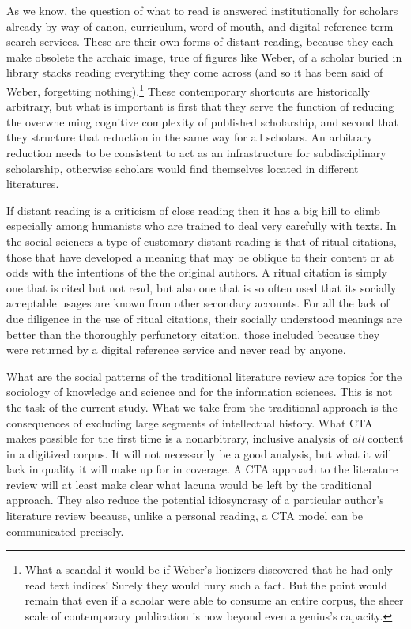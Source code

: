 \documentclass[]{book}
\let\rmarkdownfootnote\footnote%
\def\footnote{\protect\rmarkdownfootnote}
\theoremstyle{definition}
\theoremstyle{definition}
\theoremstyle{definition}
\theoremstyle{remark}
\begin{document}
As we know, the question of what to read is answered institutionally for
scholars already by way of canon, curriculum, word of mouth, and digital
reference term search services. These are their own forms of distant
reading, because they each make obsolete the archaic image, true of
figures like Weber, of a scholar buried in library stacks reading
everything they come across (and so it has been said of Weber,
forgetting nothing).\footnote{What a scandal it would be if Weber's
  lionizers discovered that he had only read text indices! Surely they
  would bury such a fact. But the point would remain that even if a
  scholar were able to consume an entire corpus, the sheer scale of
  contemporary publication is now beyond even a genius's capacity.}
These contemporary shortcuts are historically arbitrary, but what is
important is first that they serve the function of reducing the
overwhelming cognitive complexity of published scholarship, and second
that they structure that reduction in the same way for all scholars. An
arbitrary reduction needs to be consistent to act as an infrastructure
for subdisciplinary scholarship, otherwise scholars would find
themselves located in different literatures.

If distant reading is a criticism of close reading then it has a big
hill to climb especially among humanists who are trained to deal very
carefully with texts. In the social sciences a type of customary distant
reading is that of ritual citations, those that have developed a meaning
that may be oblique to their content or at odds with the intentions of
the the original authors. A ritual citation is simply one that is cited
but not read, but also one that is so often used that its socially
acceptable usages are known from other secondary accounts. For all the
lack of due diligence in the use of ritual citations, their socially
understood meanings are better than the thoroughly perfunctory citation,
those included because they were returned by a digital reference service
and never read by anyone.

What are the social patterns of the traditional literature review are
topics for the sociology of knowledge and science and for the
information sciences. This is not the task of the current study. What we
take from the traditional approach is the consequences of excluding
large segments of intellectual history. What CTA makes possible for the
first time is a nonarbitrary, inclusive analysis of \emph{all} content
in a digitized corpus. It will not necessarily be a good analysis, but
what it will lack in quality it will make up for in coverage. A CTA
approach to the literature review will at least make clear what lacuna
would be left by the traditional approach. They also reduce the
potential idiosyncrasy of a particular author's literature review
because, unlike a personal reading, a CTA model can be communicated
precisely.
\end{document}
